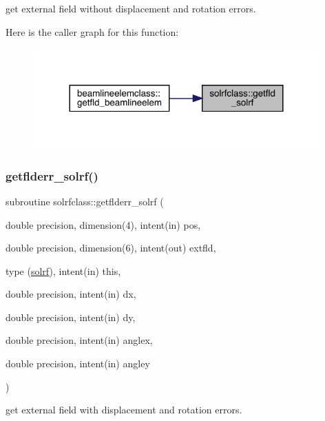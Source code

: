 get external field without displacement and rotation errors. 

Here is the caller graph for this function\+:\nopagebreak
\begin{figure}[H]
\begin{center}
\leavevmode
\includegraphics[width=312pt]{namespacesolrfclass_a394f9bb9d3b50c8652a704f3c5af16ef_icgraph}
\end{center}
\end{figure}
\mbox{\label{namespacesolrfclass_a8a44826fce541cba8b4f7f5573ec7c98}} 
\subsubsection{\texorpdfstring{getflderr\_solrf()}{getflderr\_solrf()}}
{\footnotesize\ttfamily subroutine solrfclass\+::getflderr\+\_\+solrf (\begin{DoxyParamCaption}\item[{double precision, dimension(4), intent(in)}]{pos,  }\item[{double precision, dimension(6), intent(out)}]{extfld,  }\item[{type (\mbox{\hyperlink{namespacesolrfclass_structsolrfclass_1_1solrf}{solrf}}), intent(in)}]{this,  }\item[{double precision, intent(in)}]{dx,  }\item[{double precision, intent(in)}]{dy,  }\item[{double precision, intent(in)}]{anglex,  }\item[{double precision, intent(in)}]{angley }\end{DoxyParamCaption})}



get external field with displacement and rotation errors. 

